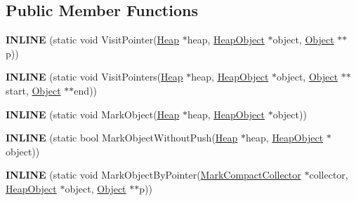 \subsection*{Public Member Functions}
\begin{DoxyCompactItemize}
\item 
{\bfseries I\+N\+L\+I\+NE} (static void Visit\+Pointer(\hyperlink{classv8_1_1internal_1_1_heap}{Heap} $\ast$heap, \hyperlink{classv8_1_1internal_1_1_heap_object}{Heap\+Object} $\ast$object, \hyperlink{classv8_1_1internal_1_1_object}{Object} $\ast$$\ast$p))\hypertarget{classv8_1_1internal_1_1_mark_compact_marking_visitor_ac918c9d208af0a7637c0fe9202e32cd3}{}\label{classv8_1_1internal_1_1_mark_compact_marking_visitor_ac918c9d208af0a7637c0fe9202e32cd3}

\item 
{\bfseries I\+N\+L\+I\+NE} (static void Visit\+Pointers(\hyperlink{classv8_1_1internal_1_1_heap}{Heap} $\ast$heap, \hyperlink{classv8_1_1internal_1_1_heap_object}{Heap\+Object} $\ast$object,                                                                                                                                   \hyperlink{classv8_1_1internal_1_1_object}{Object} $\ast$$\ast$start, \hyperlink{classv8_1_1internal_1_1_object}{Object} $\ast$$\ast$end))\hypertarget{classv8_1_1internal_1_1_mark_compact_marking_visitor_af439590c3e51d41816157e83feae3195}{}\label{classv8_1_1internal_1_1_mark_compact_marking_visitor_af439590c3e51d41816157e83feae3195}

\item 
{\bfseries I\+N\+L\+I\+NE} (static void Mark\+Object(\hyperlink{classv8_1_1internal_1_1_heap}{Heap} $\ast$heap, \hyperlink{classv8_1_1internal_1_1_heap_object}{Heap\+Object} $\ast$object))\hypertarget{classv8_1_1internal_1_1_mark_compact_marking_visitor_a6116d4f62627948d5c093c8be7828498}{}\label{classv8_1_1internal_1_1_mark_compact_marking_visitor_a6116d4f62627948d5c093c8be7828498}

\item 
{\bfseries I\+N\+L\+I\+NE} (static bool Mark\+Object\+Without\+Push(\hyperlink{classv8_1_1internal_1_1_heap}{Heap} $\ast$heap, \hyperlink{classv8_1_1internal_1_1_heap_object}{Heap\+Object} $\ast$object))\hypertarget{classv8_1_1internal_1_1_mark_compact_marking_visitor_a5027990385260bb2aa4cfcced705c017}{}\label{classv8_1_1internal_1_1_mark_compact_marking_visitor_a5027990385260bb2aa4cfcced705c017}

\item 
{\bfseries I\+N\+L\+I\+NE} (static void Mark\+Object\+By\+Pointer(\hyperlink{classv8_1_1internal_1_1_mark_compact_collector}{Mark\+Compact\+Collector} $\ast$collector,                                                                                                                                                           \hyperlink{classv8_1_1internal_1_1_heap_object}{Heap\+Object} $\ast$object, \hyperlink{classv8_1_1internal_1_1_object}{Object} $\ast$$\ast$p))\hypertarget{classv8_1_1internal_1_1_mark_compact_marking_visitor_ace35e7fd76ab80025607075c2970aab4}{}\label{classv8_1_1internal_1_1_mark_compact_marking_visitor_ace35e7fd76ab80025607075c2970aab4}


\end{DoxyCompactItemize}
